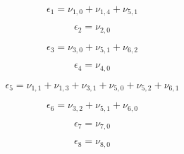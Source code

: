 \[
\epsilon_1 = \nu_{1,0} + \nu_{1,4} + \nu_{5,1}
\]

\[
\epsilon_2 = \nu_{2,0}
\]

\[
\epsilon_3 = \nu_{3,0} + \nu_{5,1} + \nu_{6,2}
\]

\[
\epsilon_4 = \nu_{4,0}
\]

\[
\epsilon_5 = \nu_{1,1} + \nu_{1,3} + \nu_{3,1} + \nu_{5,0} + \nu_{5,2} + \nu_{6,1}
\]

\[
\epsilon_6 = \nu_{3,2} + \nu_{5,1} + \nu_{6,0}
\]

\[
\epsilon_7 = \nu_{7,0}
\]

\[
\epsilon_8 = \nu_{8,0}
\]

